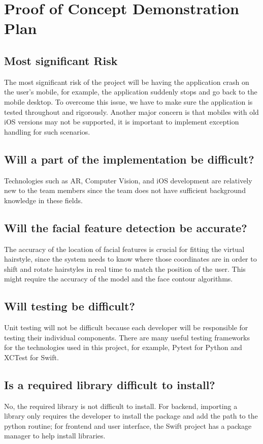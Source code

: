 \documentclass{article}
\begin{document}
\section{Proof of Concept Demonstration Plan}

\subsection{Most significant Risk}
The most significant risk of the project will be having the application crash on the user's mobile, for example, the application suddenly stops and go back to the mobile desktop. To overcome this issue, we have to make sure the application is tested throughout and rigorously. Another major concern is that mobiles with old iOS versions may not be supported, it is important to implement exception handling for such scenarios. 

\subsection{Will a part of the implementation be difficult?}
Technologies such as AR, Computer Vision, and iOS development are relatively new to the team members since the team does not have sufficient background knowledge in these fields.

\subsection{Will the facial feature detection be accurate?}
The accuracy of the location of facial features is crucial for fitting the virtual hairstyle, since the system needs to know where those coordinates are in order to shift and rotate hairstyles in real time to match the position of the user. This might require the accuracy of the model and the face contour algorithms.

\subsection{Will testing be difficult?}
Unit testing will not be difficult because each developer will be responsible for testing their individual components. There are many useful testing frameworks for the technologies used in this project, for example, Pytest for Python and XCTest for Swift.

\subsection{Is a required library difficult to install?}
No, the required library is not difficult to install. For backend, importing a library only requires the developer to install the package and add the path to the python routine; for frontend and user interface, the Swift project has a package manager to help install libraries.
\end{document}
